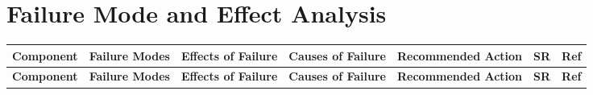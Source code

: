 \documentclass{article}
\begin{document}
\section{Failure Mode and Effect Analysis}
\begin{landscape}
    \begin{longtable}{|p{2.5cm}|p{4cm}|p{4cm}|p{4cm}|p{4cm}|p{1.25cm}|p{1cm}|}
        \hline
        \textbf{Component} & \textbf{Failure Modes} & \textbf{Effects of
        Failure} & \textbf{Causes of Failure} & \textbf{Recommended Action} &
        \textbf{SR} & \textbf{Ref} \\
        \hline
        \endfirsthead
        
        \hline
        \textbf{Component} & \textbf{Failure Modes} & \textbf{Effects of
        Failure} & \textbf{Causes of Failure} & \textbf{Recommended Action} &
        \textbf{SR} & \textbf{Ref} \\
        \hline
        \endhead
        

\end{longtable}
\end{landscape}
\end{document}
